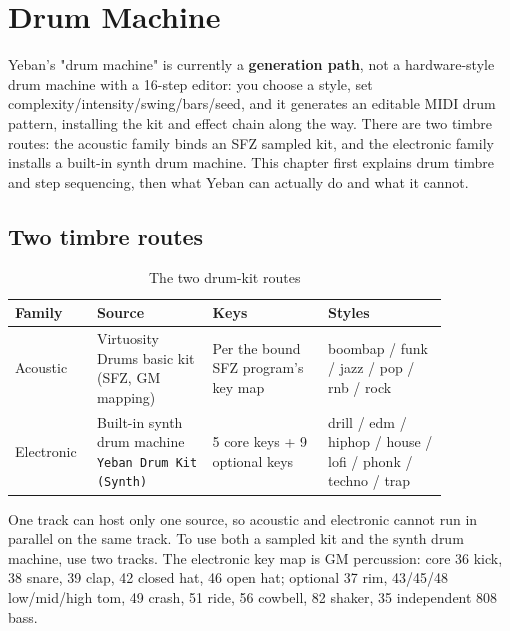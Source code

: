 \chapter{Drum Machine}
\label{chap:drum-machine}


Yeban's "drum machine" is currently a \textbf{generation path}, not a hardware-style drum machine with a 16-step editor: you choose a style, set complexity/intensity/swing/bars/seed, and it generates an editable MIDI drum pattern, installing the kit and effect chain along the way. There are two timbre routes: the acoustic family binds an SFZ sampled kit, and the electronic family installs a built-in synth drum machine. This chapter first explains drum timbre and step sequencing, then what Yeban can actually do and what it cannot.

\section{Two timbre routes}

\begin{table}[htbp]
\centering
\small
\begin{tabular}{@{}p{0.13\linewidth}p{0.24\linewidth}p{0.24\linewidth}p{0.25\linewidth}@{}}
\hline
Family & Source & Keys & Styles \\
\hline
Acoustic & Virtuosity Drums basic kit (SFZ, GM mapping) & Per the bound SFZ program's key map & boombap / funk / jazz / pop / rnb / rock \\
Electronic & Built-in synth drum machine \texttt{Yeban Drum Kit (Synth)} & 5 core keys + 9 optional keys & drill / edm / hiphop / house / lofi / phonk / techno / trap \\
\hline
\end{tabular}
\caption{The two drum-kit routes}
\label{tab:drum-families}
\end{table}

One track can host only one source, so acoustic and electronic cannot run in parallel on the same track. To use both a sampled kit and the synth drum machine, use two tracks. The electronic key map is GM percussion: core 36 kick, 38 snare, 39 clap, 42 closed hat, 46 open hat; optional 37 rim, 43/45/48 low/mid/high tom, 49 crash, 51 ride, 56 cowbell, 82 shaker, 35 independent 808 bass.

